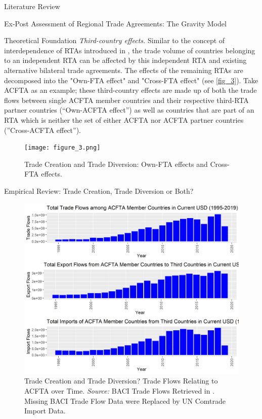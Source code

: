 \begin{section}{Literature Review}
\begin{subsection}{Ex-Post Assessment of Regional Trade Agreements: The Gravity Model}
\begin{subsubsection}{Theoretical Foundation}
\textit{Third-country effects.} Similar to the concept of interdependence of RTAs introduced in \cite{bbm2014}, the trade volume of countries belonging to an independent RTA can be affected by this independent RTA and existing alternative bilateral trade agreements. The effects of the remaining RTAs are decomposed into the "Own-FTA effect" and "Cross-FTA effect" (see \autoref{fig_3}). Take ACFTA as an example; these third-country effects are made up of both the trade flows between single ACFTA member countries and their respective third-RTA partner countries (“Own-ACFTA effect”) as well as countries that are part of an RTA which is neither the set of either ACFTA nor ACFTA partner countries (”Cross-ACFTA effect”). 

\begin{figure}[H]
	\centering
	\texttt{[image: figure\_3.png]}
	\caption{\small{Trade Creation and Trade Diversion: Own-FTA effects and Cross-FTA effects.}}
	\label{fig_3}
\end{figure}

\end{subsubsection}

\begin{subsubsection}{Empirical Review: Trade Creation, Trade Diversion or Both?}

\begin{figure}[H]
	\centering
	\includegraphics[width=\textwidth]{figure_2.png}
	\caption{\small{Trade Creation and Trade Diversion? Trade Flows Relating to ACFTA over Time. \textit{Source:} BACI Trade Flows Retrieved in \cite{cepii-data_2022}. Missing BACI Trade Flow Data were Replaced by UN Comtrade Import Data.}}
	\label{fig_2}
\end{figure}


\end{subsubsection}
\end{subsection}
\end{section}
